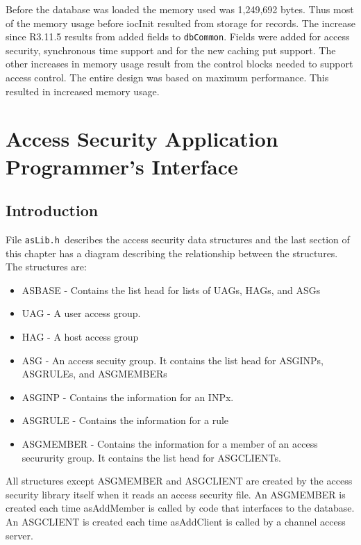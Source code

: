 Before the database was loaded the memory used was 1,249,692 bytes. Thus most of the memory usage before iocInit 
resulted from storage for records. The increase since R3.11.5 results from added fields to \verb|dbCommon|. Fields were added 
for access security, synchronous time support and for the new caching put support. The other increases in memory usage 
result from the control blocks needed to support access control. The entire design was based on maximum performance. 
This resulted in increased memory usage.

\section{Access Security Application Programmer's Interface}

\subsection{Introduction}

File \verb|asLib.h |describes the access security data structures and the last section of this chapter has a diagram describing 
the relationship between the structures. The structures are:

\begin{itemize}\item ASBASE - Contains the list head for lists of UAGs, HAGs, and ASGs

\item UAG - A user access group.

\item HAG - A host access group

\item ASG - An access secuity group. It contains the list head for ASGINPs, ASGRULEs, and ASGMEMBERs

\item ASGINP - Contains the information for an INPx.

\item ASGRULE - Contains the information for a rule

\item ASGMEMBER - Contains the information for a member of an access secururity group. It contains the list head for 
ASGCLIENTs.

\end{itemize}All structures except ASGMEMBER and ASGCLIENT are created by the access security library itself  when it reads an 
access security file. An ASGMEMBER is created each time asAddMember is called by code that interfaces to the 
database. An ASGCLIENT is created each time asAddClient is called by a channel access server.

